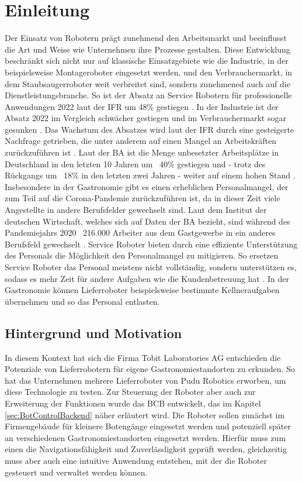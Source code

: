 \section{Einleitung}
Der Einsatz von Robotern prägt zunehmend den Arbeitsmarkt und beeinflusst die Art und Weise wie Unternehmen ihre Prozesse gestalten. Diese Entwicklung beschränkt sich nicht nur auf klassische Einsatzgebiete wie die Industrie, in der beispielsweise Montageroboter eingesetzt werden, und den Verbrauchermarkt, in dem Staubsaugerroboter weit verbreitet sind, sondern zunehmened auch auf die Dienstleistungsbranche. So ist der Absatz an Service Robotern für professionelle Anwendungen 2022 laut der \ac{IFR} um 48\% gestiegen \cite{IFR2023}. In der Industrie ist der Absatz 2022 im Vergleich schwächer gestiegen \cite[S.~9]{WorldRobotics2023} und im Verbrauchermarkt sogar gesunken \cite[S.~37]{WorldRobotics2023}. Das Wachstum des Absatzes wird laut der \ac{IFR} durch eine gesteigerte Nachfrage getrieben, die unter anderem auf einen Mangel an Arbeitskräften zurückzuführen ist \cite[S.~36]{WorldRobotics2023}. Laut der \ac{BA} ist die Menge unbesetzter Arbeitsplätze in Deutschland in den letzten 10 Jahren um ~40\% gestiegen und - trotz des Rückgangs um ~18\% in den letzten zwei Jahren - weiter auf einem hohen Stand \cite{BA2024}. Insbesondere in der Gastronomie gibt es einen erheblichen Personalmangel, der zum Teil auf die Corona-Pandemie zurückzuführen ist, da in dieser Zeit viele Angestellte in andere Berufsfelder gewechselt sind. Laut dem Institut der deutschen Wirtschaft, welches sich auf Daten der \ac{BA} bezieht, sind während des Pandemiejahrs 2020 ~216.000 Arbeiter aus dem Gastgewerbe in ein anderes Berufsfeld gewechselt \cite{BA2024}. Service Roboter bieten durch eine effiziente Unterstützung des Personals die Möglichkeit den Personalmangel zu mitigieren. So ersetzen Service Roboter das Personal meistens nicht vollständig, sondern unterstützen es, sodass es mehr Zeit für andere Aufgaben wie die Kundenbetreuung hat \cite[S.~271-272]{Sprenger2015}. In der Gastronomie können Lieferroboter beispielsweise bestimmte Kellneraufgaben übernehmen und so das Personal entlasten.

\subsection{Hintergrund und Motivation}
In diesem Kontext hat sich die Firma Tobit Laboratories AG entschieden die Potenziale von Lieferrobotern für eigene Gastronomiestandorten zu erkunden. So hat das Unternehmen mehrere Lieferroboter von Pudu Robotics erworben, um diese Technologie zu testen. Zur Steuerung der Roboter aber auch zur Erweiterung der Funktionen wurde das \ac{BCB} entwickelt, das im Kapitel \ref{sec:BotControlBackend} näher erläutert wird. Die Roboter sollen zunächst im Firmengebäude für kleinere Botengänge eingesetzt werden und potenziell später an verschiedenen Gastronomiestandorten eingesetzt werden. Hierfür muss zum einen die Navigationsfähigkeit und Zuverlässligkeit geprüft werden, gleichzeitig muss aber auch eine intuitive Anwendung entstehen, mit der die Roboter gesteuert und verwaltet werden können.

